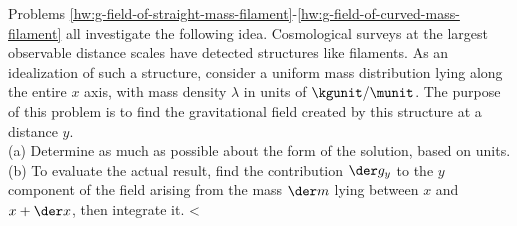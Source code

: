 Problems \ref{hw:g-field-of-straight-mass-filament}-\ref{hw:g-field-of-curved-mass-filament} all investigate the following idea.
Cosmological surveys at the largest observable distance scales have
detected structures like filaments. As an idealization of such a structure, consider a
uniform mass distribution lying along the entire $x$ axis, with mass density $\lambda$
in units of $\kgunit/\munit$. The purpose of this problem is to 
find the gravitational field created by this structure at a distance $y$.\\
(a) Determine as much as possible about the form of the solution, based on units.\hwendpart
(b) To evaluate the actual result, find the contribution $\der g_y$ to the $y$ component of the field arising
from the mass $\der m$ lying between $x$ and $x+\der x$, then integrate it.
        <%
